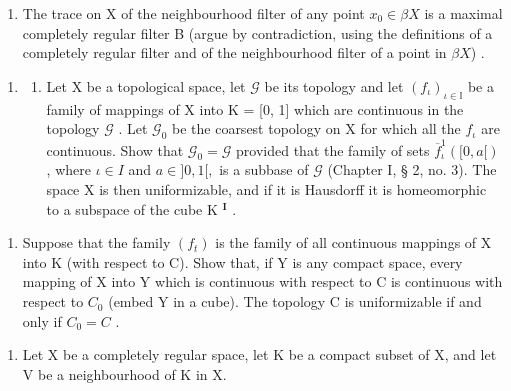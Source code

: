 \begin{enumerate}
\def\labelenumi{\alph{enumi})}
\setcounter{enumi}{4}
\tightlist
\item
  The trace on X of the neighbourhood filter of any point \(x_{0} \in \beta X\) is a maximal completely regular filter B (argue by contradiction, using the definitions of a completely regular filter and of the neighbourhood filter of a point in \(\beta X\)) .
\end{enumerate}

\begin{enumerate}
\def\labelenumi{\arabic{enumi})}
\setcounter{enumi}{8}
\tightlist
\item
  \begin{enumerate}
  \def\labelenumii{\alph{enumii})}
  \tightlist
  \item
    Let X be a topological space, let \(\mathcal{G}\) be its topology and let \((f_{\iota})_{\iota \in \mathbb{I}}\) be a family of mappings of X into K = {[}0, 1{]} which are continuous in the topology \(\mathcal{G}\) . Let \(\mathcal{G}_0\) be the coarsest topology on X for which all the \(f_{\iota}\) are continuous. Show that \(\mathcal{G}_0 = \mathcal{G}\) provided that the family of sets \(\overline{f}_{\iota}^{1}([0, a[)\) , where \(\iota \in I\) and \(a \in ]0, 1[,\) is a subbase of \(\mathcal{G}\) (Chapter I, § 2, no. 3). The space X is then uniformizable, and if it is Hausdorff it is homeomorphic to a subspace of the cube K \(^{\mathbf{I}}\) .
  \end{enumerate}
\end{enumerate}

\begin{enumerate}
\def\labelenumi{\alph{enumi})}
\setcounter{enumi}{1}
\tightlist
\item
  Suppose that the family \((f_{t})\) is the family of all continuous mappings of X into K (with respect to C). Show that, if Y is any compact space, every mapping of X into Y which is continuous with respect to C is continuous with respect to \(C_{0}\) (embed Y in a cube). The topology C is uniformizable if and only if \(C_{0} = C\) .
\end{enumerate}

\begin{enumerate}
\def\labelenumi{\arabic{enumi})}
\setcounter{enumi}{9}
\tightlist
\item
  Let X be a completely regular space, let K be a compact subset of X, and let V be a neighbourhood of K in X.
\end{enumerate}

